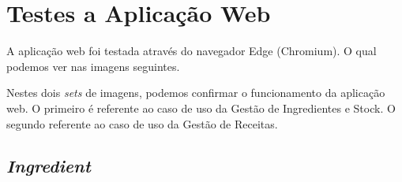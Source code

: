 \newpage
\section{Testes a Aplicação Web}

A aplicação web foi testada através do navegador Edge (Chromium). O qual podemos ver nas imagens seguintes.

Nestes dois \textit{sets} de imagens, podemos confirmar o funcionamento da aplicação web. O primeiro é referente ao caso de uso da Gestão de Ingredientes e Stock. O segundo referente ao caso de uso da Gestão de Receitas.

\subsection{\textit{Ingredient}}

